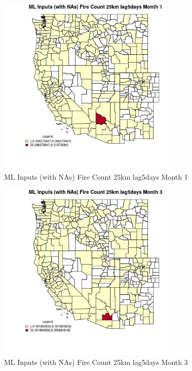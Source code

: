 \clearpage 

\begin{figure} 
\centering  
\includegraphics[width=0.77\textwidth]{Code_Outputs/Report_ML_input_PM25_Step4_part_e_de_duplicated_aves_compiled_2019-05-21wNAs_CountyFire_Count_25km_lag5daysmedianMonth1.jpg} 
\caption{\label{fig:Report_ML_input_PM25_Step4_part_e_de_duplicated_aves_compiled_2019-05-21wNAsCountyFire_Count_25km_lag5daysmedianMonth1}ML Inputs (with NAs) Fire Count 25km lag5days Month 1} 
\end{figure} 
 

\begin{figure} 
\centering  
\includegraphics[width=0.77\textwidth]{Code_Outputs/Report_ML_input_PM25_Step4_part_e_de_duplicated_aves_compiled_2019-05-21wNAs_CountyFire_Count_25km_lag5daysmedianMonth3.jpg} 
\caption{\label{fig:Report_ML_input_PM25_Step4_part_e_de_duplicated_aves_compiled_2019-05-21wNAsCountyFire_Count_25km_lag5daysmedianMonth3}ML Inputs (with NAs) Fire Count 25km lag5days Month 3} 
\end{figure} 
 

